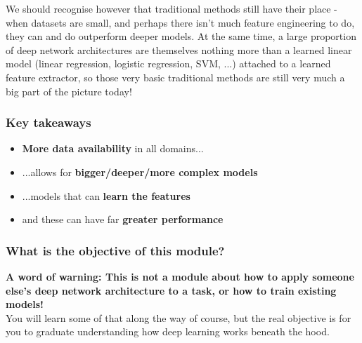 \documentclass[]{article}
\begin{document}
We should recognise however that traditional methods still have their place - when datasets are small, and perhaps there isn't much feature engineering to do, they can and do outperform deeper models. At the same time, a large proportion of deep network architectures are themselves nothing more than a learned linear model (linear regression, logistic regression, SVM, ...) attached to a learned feature extractor, so those very basic traditional methods are still very much a big part of the picture today!

\begin{frame}
	\frametitle{Key takeaways}

	\begin{itemize}
		\item<+-> \textbf{More data availability} in all domains...
		\item<+-> ...allows for \textbf{bigger/deeper/more complex models}
		\item<+-> ...models that can \textbf{learn the features}
		\item<+-> and these can have far \textbf{greater performance}
	\end{itemize}
\end{frame}

\begin{frame}
	\frametitle{What is the objective of this module?}

	\textbf{A word of warning: This is not a module about how to apply someone else's deep network architecture to a task, or how to train existing models!}
	\\[1em]
	You will learn some of that along the way of course, but the real objective is for you to graduate understanding how deep learning works beneath the hood.
\end{frame}
\end{document}
